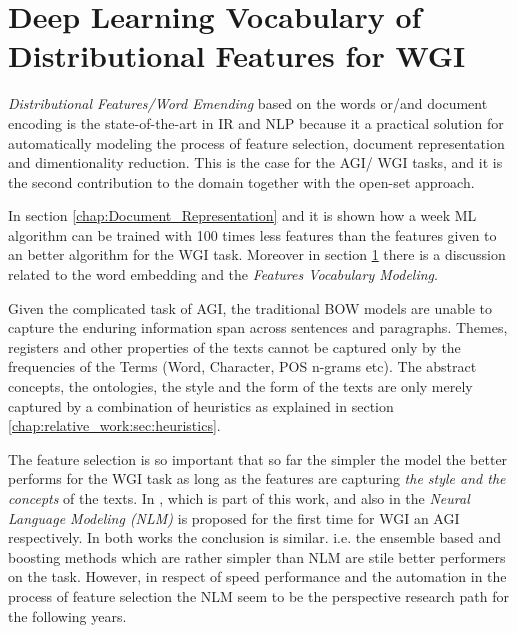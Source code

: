 
\section{Deep Learning Vocabulary of Distributional Features for WGI}\label{chap:relevant_work:sec:word_embedding}

\textit{Distributional Features/Word Emending} based on the words or/and document encoding is the state-of-the-art in IR and NLP because it a practical solution for automatically modeling the process of feature selection, document representation and dimentionality reduction. This is the case for the AGI/ WGI tasks, and it is the second contribution to the domain together with the open-set approach.

In section \ref{chap:Document_Representation} and it is shown how a week ML algorithm can be trained with 100 times less features than the features given to an better algorithm for the WGI task. Moreover in section \ref{chap:relevant_work:sec:word_embedding} there is a discussion related to the word embedding and the \textit{Features Vocabulary Modeling}.


Given the complicated task of AGI, the traditional BOW models are unable to capture the enduring information span across sentences and paragraphs. Themes, registers and other properties of the texts cannot be captured only by the frequencies of the Terms (Word, Character, POS n-grams etc). The abstract concepts, the ontologies, the style and the form of the texts are only merely captured by a combination of heuristics as explained in section \ref{chap:relative_work:sec:heuristics}. 

The feature selection is so important that so far the simpler the model the better performs for the WGI task as long as the features are capturing \textit{the style and the concepts} of the texts. In \parencite{pritsos2019open}, which is part of this work, and also in \parencite{worsham2018genre} the \textit{Neural Language Modeling (NLM)} is proposed for the first time for WGI an AGI respectively. In both works the conclusion is similar. i.e. the ensemble based and boosting methods which are rather simpler than NLM are stile better performers on the task. However, in respect of speed performance and the automation in the process of feature selection the NLM seem to be the perspective research path for the following years.

